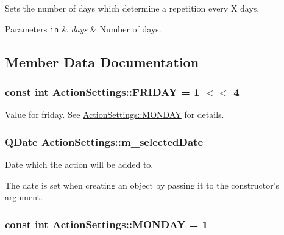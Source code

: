 Sets the number of days which determine a repetition every X days. 


\begin{DoxyParams}[1]{Parameters}
\mbox{\tt in}  & {\em days} & Number of days. \\
\hline
\end{DoxyParams}


\subsection{Member Data Documentation}
\hypertarget{class_action_settings_aa70504579778b73eb6627609d2360bf5}{
\subsubsection[{F\-R\-I\-D\-A\-Y}]{\setlength{\rightskip}{0pt plus 5cm}const int Action\-Settings\-::\-F\-R\-I\-D\-A\-Y = 1 $<$$<$ 4\hspace{0.3cm}{\ttfamily [static]}}}\label{class_action_settings_aa70504579778b73eb6627609d2360bf5}


Value for friday. See \hyperlink{class_action_settings_a0a99a4562e37a11225063d1a10e0953a}{Action\-Settings\-::\-M\-O\-N\-D\-A\-Y} for details. 

\hypertarget{class_action_settings_a3aa508428dcaa5c930b6a46d6471a770}{
\subsubsection[{m\-\_\-selected\-Date}]{\setlength{\rightskip}{0pt plus 5cm}Q\-Date Action\-Settings\-::m\-\_\-selected\-Date\hspace{0.3cm}{\ttfamily [private]}}}\label{class_action_settings_a3aa508428dcaa5c930b6a46d6471a770}


Date which the action will be added to. 

The date is set when creating an object by passing it to the constructor's argument. \hypertarget{class_action_settings_a0a99a4562e37a11225063d1a10e0953a}{
\subsubsection[{M\-O\-N\-D\-A\-Y}]{\setlength{\rightskip}{0pt plus 5cm}const int Action\-Settings\-::\-M\-O\-N\-D\-A\-Y = 1\hspace{0.3cm}{\ttfamily [static]}}}\label{class_action_settings_a0a99a4562e37a11225063d1a10e0953a}


